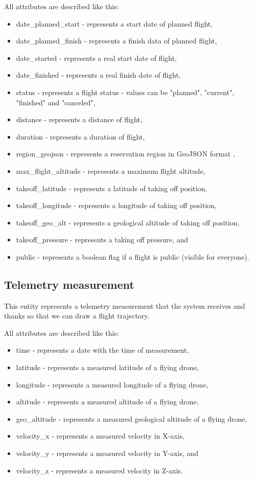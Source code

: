 All attributes are described like this:
\begin{itemize}
    \item date\_planned\_start - represents a start date of planned flight,
    \item date\_planned\_finish - represents a finish data of planned flight,
    \item date\_started - represents a real start date of flight,
    \item date\_finished - represents a real finish date of flight,
    \item status - represents a flight status - values can be "planned", "current", "finished" and "canceled",
    \item distance - represents a distance of flight,
    \item duration - represents a duration of flight,
    \item region\_geojson - represents a reservation region in GeoJSON format \cite{geoJson},
    \item max\_flight\_altitude - represents a maximum flight altitude,
    \item takeoff\_latitude - represents a latitude of taking off position,
    \item takeoff\_longitude - represents a longitude of taking off position,
    \item takeoff\_geo\_alt - represents a geological altitude of taking off position,
    \item takeoff\_pressure - represents a taking off pressure, and
    \item public - represents a boolean flag if a flight is public (visible for everyone).
\end{itemize}

\subsection{Telemetry measurement}\label{subsec:telemetry-measurement}
This entity represents a telemetry measurement that the system receives and thanks so that we can draw a flight trajectory.

All attributes are described like this:
\begin{itemize}
    \item time - represents a date with the time of measurement,
    \item latitude - represents a measured latitude of a flying drone,
    \item longitude - represents a measured longitude of a flying drone,
    \item altitude - represents a measured altitude of a flying drone,
    \item geo\_altitude - represents a measured geological altitude of a flying drone,
    \item velocity\_x - represents a measured velocity in X-axis,
    \item velocity\_y - represents a measured velocity in Y-axis, and
    \item velocity\_z - represents a measured velocity in Z-axis.
\end{itemize}

